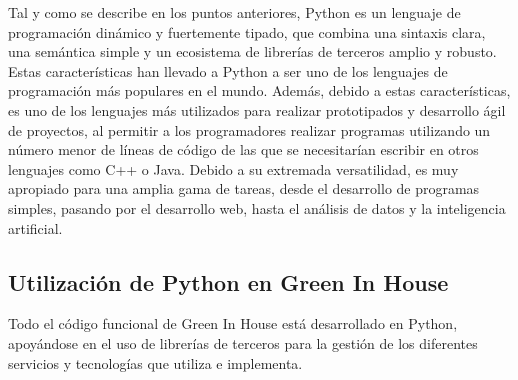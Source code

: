 Tal y como se describe en los puntos anteriores, Python es un lenguaje de programación dinámico y fuertemente tipado, que combina una sintaxis clara, una semántica simple y un ecosistema de librerías de terceros amplio y robusto. Estas características han llevado a Python a ser uno de los lenguajes de programación más populares en el mundo. Además, debido a estas características, es uno de los lenguajes más utilizados para realizar prototipados y desarrollo ágil de proyectos, al permitir a los programadores realizar programas utilizando un número menor de líneas de código de las que se necesitarían escribir en otros lenguajes como C++ o Java. Debido a su extremada versatilidad, es muy apropiado para una amplia gama de tareas, desde el desarrollo de programas simples, pasando por el desarrollo web, hasta el análisis de datos y la inteligencia artificial.
\subsection{Utilización de Python en Green In House}
Todo el código funcional de Green In House está desarrollado en Python, apoyándose en el uso de librerías de terceros para la gestión de los diferentes servicios y tecnologías que utiliza e implementa.

